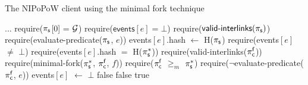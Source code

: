 \begin{algorithm}
    \caption{\label{alg:minimal-fork}The \textsf{NIPoPoW} client using the minimal fork technique}

    \begin{algorithmic}[1]

    \State ...
        \State \textsf{require}($\mathsf{\pi_{s}}$[0] = $\mathcal{G}$)
        \State \textsf{require}($\textsf{events$[e]$} = \bot$)
        \State \textsf{require}($\textsf{valid-interlinks}(\mathsf{\pi_{s}})$)
        \State \textsf{require}(\textsf{evaluate-predicate}(\textsf{$\mathsf{\pi_{s}}$},
        $e$))
        \State \textsf{events$[e]$.hash} $\gets$ \textsf{H}($\mathsf{\pi_{s}}$)
    \EndFunction
        \State \textsf{require}(\textsf{events}$[e]$ $\ne$ $\bot$)
        \State \textsf{require}(\textsf{events$[e]$.hash} $=$ \textsf{H}($\mathsf{\pi_{s}^*}$))
        \State \textsf{require}(\textsf{valid-interlinks}($\mathsf{\pi_{c}^{f}}$))
        \State \textsf{require}(\textsf{minimal-fork}($\mathsf{\pi_{s}^*}$,
        $\mathsf{\pi_{c}^{f}}$, $f$))
        \State \textsf{require}($\mathsf{\pi_{c}^{f}}$ $\geq_m$ $\mathsf{\pi_{s}^*}$)
        \State \textsf{require}(\textsf{$\neg$evaluate-predicate}($\mathsf{\pi_{c}^{f}}$, $e$))
        \State \textsf{events$[e]$} $\gets$ $\bot$
    \EndFunction
    \label{alg:minimal-fork:minimal-fork}
        \State\Return false
    \EndIf
            \State\Return false
        \EndIf
    \EndFor
    \State\Return true
    \EndFunction
    \EndContract
    \vskip8pt
    \end{algorithmic}
\end{algorithm}

